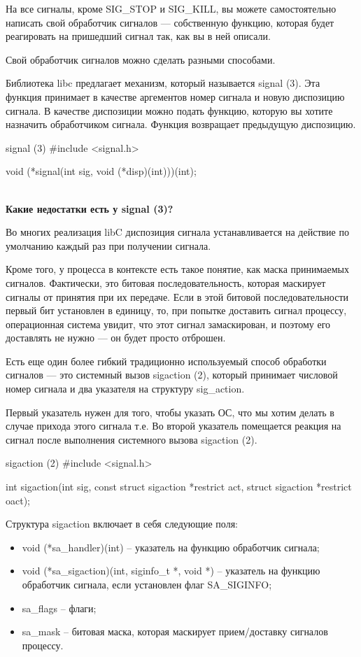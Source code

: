 На все сигналы, кроме SIG\_STOP и SIG\_KILL, вы можете самостоятельно написать свой обработчик сигналов --- собственную функцию, которая будет реагировать на пришедший сигнал так, как вы в ней описали.

Свой обработчик сигналов можно сделать разными способами.

Библиотека libc предлагает механизм, который называется signal (3). Эта функция принимает в качестве аргементов номер сигнала и новую диспозицию сигнала. В качестве диспозиции можно подать функцию, которую вы хотите назначить обработчиком сигнала. Функция возвращает предыдущую диспозицию.

\begin{CCode}{signal (3)}
	#include <signal.h>

    void (*signal(int sig, void (*disp)(int)))(int); \end{CCode}
\\[0.5cm]

\textbf{Какие недостатки есть у signal (3)?}

Во многих реализация libC диспозиция сигнала устанавливается на действие по умолчанию каждый раз при получении сигнала.

Кроме того, у процесса в контексте есть такое понятие, как маска принимаемых сигналов. Фактически, это битовая последовательность, которая маскирует сигналы от принятия при их передаче. Если в этой битовой последовательности первый бит установлен в единицу, то, при попытке доставить сигнал процессу, операционная система увидит, что этот сигнал замаскирован, и поэтому его доставлять не нужно --- он будет просто отброшен.

Есть еще один более гибкий традиционно используемый способ обработки сигналов --- это системный вызов sigaction (2), который принимает числовой номер сигнала и два указателя на структуру sig\_action.

Первый указатель нужен для того, чтобы указать ОС, что мы хотим делать в случае прихода этого сигнала т.е. Во второй указатель помещается реакция на сигнал после выполнения системного вызова sigaction (2).

\begin{CCode}{sigaction (2)}
	#include <signal.h>

     int sigaction(int sig, const struct sigaction *restrict act,
         struct sigaction *restrict oact);  \end{CCode}

Структура sigaction включает в себя следующие поля:

\begin{itemize}
	\item void (*sa\_handler)(int) -- указатель на функцию обработчик сигнала;
	\item void (*sa\_sigaction)(int, siginfo\_t *, void *) -- указатель на функцию обработчик сигнала, если установлен флаг SA\_SIGINFO;
	\item sa\_flags -- флаги;
	\item sa\_mask -- битовая маска, которая маскирует прием/доставку сигналов процессу.
\end{itemize}
